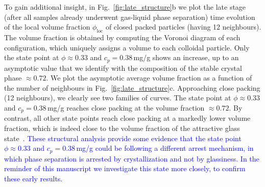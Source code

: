 \documentclass[preprint,amsmath,amssymb,superscriptaddress]{revtex4-1}
\begin{document}
To gain additional insight, in Fig.~\ref{fig:late_structure}b we plot the late stage (after all samples already underwent gas-liquid phase separation) time evolution of the local volume fraction $\phi_\mathrm{loc}$ of closed packed particles (having 12 neighbours). The volume fraction is obtained by computing the Voronoi diagram of each configuration, which uniquely assigns a volume to each colloidal particle. Only the state point at $\phi\approx 0.33$ and $c_p = 0.38\,$mg/g shows an increase, up to an asymptotic value that we identify with the composition of the stable crystal phase $\approx 0.72$. We plot the asymptotic average volume fraction as a function of the number of neighbours in Fig.~\ref{fig:late_structure}c. Approaching close packing (12 neighbours), we clearly see two families of curves. The state point at $\phi\approx 0.33$ and $c_p=0.38\,$mg/g reaches close packing at the volume fraction $\approx 0.72$. By contrast, all other state points reach close packing at a markedly 
lower volume fraction, which is indeed close to the volume fraction of the attractive glass state~\cite{pham2002multiple}.  \textcolor{blue}{These structural analysis provide some evidence that the state point $\phi\approx 0.33$ and $c_p=0.38\,$mg/g could be following a different arrest mechanism, in which phase separation is arrested by crystallization and not by glassiness. In the reminder of this manuscript we investigate this state more closely, to confirm these early results.}


\end{document}
